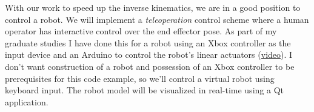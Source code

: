 \documentclass[12pt]{article}
\begin{document}
\makeatletter
\renewcommand{\@maketitle}{
\newpage
\null
\vskip 2em
\begin{center}
{\LARGE \@title \par}
\end{center}
\par
} \makeatother

\maketitle

With our work to speed up the inverse kinematics, we are in a good position to control a robot. We will implement a \emph{teleoperation} control scheme where a human operator has interactive control over the end effector pose. As part of my graduate studies I have done this for a robot using an Xbox controller as the input device and an Arduino to control the robot's linear actuators (\href{https://www.youtube.com/watch?v=KlU_Ypar5u8}{video}). I don't want construction of a robot and possession of an Xbox controller to be prerequisites for this code example, so we'll control a virtual robot using keyboard input. The robot model will be visualized in real-time using a Qt application.
\end{document}
